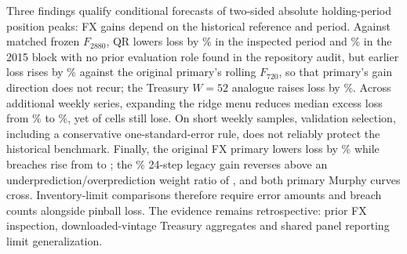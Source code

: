 Three findings qualify conditional forecasts of two-sided absolute holding-period position peaks: FX gains depend on the historical reference and period. Against matched frozen $F_{2880}$, QR lowers loss by \FXMatchedGain{}\% in the inspected period and \RWritingMatchedGain{}\% in the 2015 block with no prior evaluation role found in the repository audit, but earlier loss rises by \RWritingOriginalExcess{}\% against the original primary's rolling $F_{720}$, so that primary's gain direction does not recur; the Treasury $W=52$ analogue raises loss by \RWritingTreasuryExcess{}\%. Across \PanelSeriesCount{} additional weekly series, expanding the ridge menu reduces median excess loss from \PanelOriginalMedian{}\% to \PanelExpandedMedian{}\%, yet \PanelExpandedLosses{} of \PanelCellCount{} cells still lose. On short weekly samples, validation selection, including a conservative one-standard-error rule, does not reliably protect the historical benchmark. Finally, the original FX primary lowers loss by \FXPrimaryGain{}\% while breaches rise from \FXReferenceBreaches{} to \FXPrimaryBreaches{}; the \FXLegacyGain{}\% 24-step legacy gain reverses above an underprediction/overprediction weight ratio of \FXLegacyCrossing{}, and both primary Murphy curves cross. Inventory-limit comparisons therefore require error amounts and breach counts alongside pinball loss. The evidence remains retrospective: prior FX inspection, downloaded-vintage Treasury aggregates and shared panel reporting limit generalization.
